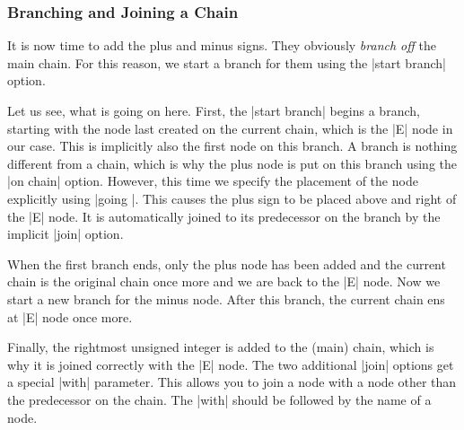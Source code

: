 \subsubsection{Branching and Joining a Chain}

It is now time to add the plus and minus signs. They obviously
\emph{branch off} the main chain. For this reason, we start a branch
for them using the |start branch| option.
\begin{codeexample}[]
\end{codeexample}

Let us see, what is going on here. First, the |start branch| begins a
branch, starting with the node last created on the current chain,
which is the |E| node in our case. This is implicitly also the first
node on this branch. A branch is nothing different from a chain, which
is why the plus node is put on this branch using the |on chain|
option. However, this time we specify the placement of the node
explicitly using |going |. This causes the plus sign
to be placed above and right of the |E| node. It is automatically
joined to its predecessor on the branch by the implicit |join|
option.

When the first branch ends, only the plus node has been added and the
current chain is the original chain once more and we are back to the
|E| node. Now we start a new branch for the minus node. After this
branch, the current chain ens at |E| node once more.

Finally, the rightmost unsigned integer is added to the (main) chain,
which is why it is joined correctly with the |E| node. The two
additional |join| options get a special |with| parameter. This allows
you to join a node with a node other than the predecessor on the
chain. The  |with| should be followed by the name of a node.

